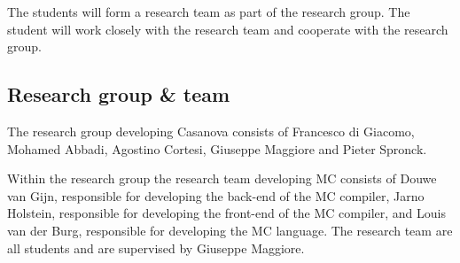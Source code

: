 The students will form a research team as part of the research group.
The student will work closely with the research team and cooperate with the research group.


\subsection{Research group \& team}
The research group developing Casanova consists of Francesco di Giacomo, Mohamed Abbadi, Agostino  Cortesi,  Giuseppe  Maggiore and Pieter Spronck.

Within the research group the research team developing MC consists of Douwe van Gijn, responsible for developing the back-end of the MC compiler, Jarno Holstein, responsible for developing the front-end of the MC compiler, and Louis van der Burg, responsible for developing the MC language.
The research team are all students and are supervised by Giuseppe Maggiore.






